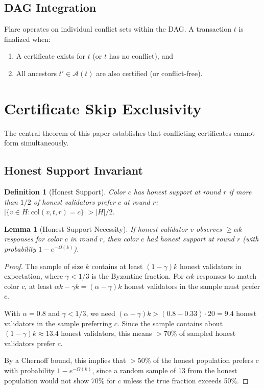 \documentclass[11pt,a4paper]{article}
\newtheorem{lemma}[theorem]{Lemma}
\newtheorem{definition}{Definition}[section]
\begin{document}
\subsection{DAG Integration}

Flare operates on individual conflict sets within the DAG. A transaction $t$ is finalized
when:
\begin{enumerate}[nosep]
\item A certificate exists for $t$ (or $t$ has no conflict), and
\item All ancestors $t' \in \mathcal{A}(t)$ are also certified (or conflict-free).
\end{enumerate}

\section{Certificate Skip Exclusivity}
\label{sec:cse}

The central theorem of this paper establishes that conflicting certificates cannot
form simultaneously.

\subsection{Honest Support Invariant}

\begin{definition}[Honest Support]
Color $c$ has \emph{honest support at round $r$} if more than $1/2$ of honest validators
prefer $c$ at round $r$: $|\{v \in H : \text{col}(v, t, r) = c\}| > |H|/2$.
\end{definition}

\begin{lemma}[Honest Support Necessity]
\label{lem:honest-support}
If honest validator $v$ observes $\geq \alpha k$ responses for color $c$ in round $r$,
then color $c$ had honest support at round $r$ (with probability $1 - e^{-\Omega(k)}$).
\end{lemma}

\begin{proof}
The sample of size $k$ contains at least $(1 - \gamma)k$ honest validators in expectation,
where $\gamma < 1/3$ is the Byzantine fraction. For $\alpha k$ responses to match color $c$,
at least $\alpha k - \gamma k = (\alpha - \gamma)k$ honest validators in the sample must
prefer $c$.

With $\alpha = 0.8$ and $\gamma < 1/3$, we need $(\alpha - \gamma)k > (0.8 - 0.33) \cdot 20 = 9.4$
honest validators in the sample preferring $c$. Since the sample contains about
$(1-\gamma)k \approx 13.4$ honest validators, this means $> 70\%$ of sampled honest
validators prefer $c$.

By a Chernoff bound, this implies that $> 50\%$ of the honest population prefers $c$
with probability $1 - e^{-\Omega(k)}$, since a random sample of 13 from the honest
population would not show 70\% for $c$ unless the true fraction exceeds 50\%.
\end{proof}
\end{document}
